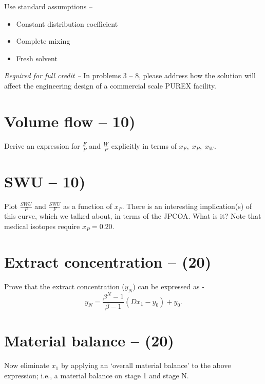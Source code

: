 \documentclass[11pt,a4paper]{article}
\begin{document}
Use standard assumptions --
\begin{itemize}
    \item Constant distribution coefficient
    \item Complete mixing
    \item Fresh solvent
\end{itemize}


\textit{Required for full credit -- } In problems 3 -- 8, please address how the solution will affect the engineering design of a commercial scale PUREX facility. 

\newpage

\section{Volume flow -- 10)}
Derive an expression for $\frac{F}{P}$ and $\frac{W}{P}$ explicitly in terms of $x_F, \; x_P, \; x_W$.





\newpage


\section{SWU -- 10)}
Plot $\frac{SWU}{P}$ and $\frac{SWU}{F}$ as a function of $x_P$. There is an interesting implication(s) of this curve, which we talked about, in terms of the JPCOA. What is it? Note that medical isotopes require $x_P = 0.20$.





\newpage


\section{Extract concentration -- (20)}
Prove that the extract concentration ($y_N$) can be expressed as -
\begin{equation}
    y_N = \frac{\beta^N - 1}{\beta - 1}(Dx_1 - y_0)+ y_0.
\end{equation}





\newpage


\section{Material balance -- (20)}
Now eliminate $x_1$ by applying an ‘overall material balance’ to the above expression; i.e., a material balance on stage 1 and stage N.
\end{document}
